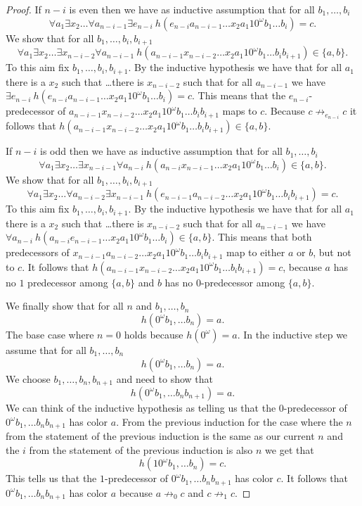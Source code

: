 \documentclass[a4paper]{article}
\begin{document}
\begin{proof}
If $n - i$ is even then we have as inductive assumption that for all
$b_1,\dots,b_i$
\[
 \forall a_1 \exists x_2 \dots \forall a_{n - i - 1} \exists e_{n - i} \
h(e_{n - i} a_{n - i - 1} \dots x_2 a_1 1 0^\omega b_1 \dots b_i) = c.
\]
We show that for all $b_1,\dots,b_i,b_{i + 1}$
\[
 \forall a_1 \exists x_2 \dots \exists x_{n - i - 2} \forall a_{n - i -
1} \ h(a_{n - i - 1} x_{n - i - 2} \dots x_2 a_1 1 0^\omega b_1 \dots
b_i b_{i + 1}) \in \{a,b\}.
\]
To this aim fix $b_1,\dots,b_i,b_{i + 1}$. By the inductive hypothesis
we have that for all $a_1$ there is a $x_2$ such that \dots there is
$x_{n - i - 2}$ such that for all $a_{n - i - 1}$ we have $\exists e_{n
- i} \ h(e_{n - i} a_{n - i - 1} \dots x_2 a_1 1 0^\omega b_1 \dots b_i)
  = c$. This means that the $e_{n - i}$-predecessor of $a_{n - i - 1}
x_{n - i - 2} \dots x_2 a_1 1 0^\omega b_1 \dots b_i b_{i + 1}$ maps to
$c$. Because $c \not \rightarrow_{e_{n - i}} c$ it follows that $h(a_{n
- i - 1} x_{n - i - 2} \dots x_2 a_1 1 0^\omega b_1 \dots b_i b_{i + 1})
\in \{a,b\}$.

If $n - i$ is odd then we have as inductive assumption that for all
$b_1,\dots,b_i$
\[
 \forall a_1 \exists x_2
\dots \exists x_{n - i - 1} \forall a_{n - i} \
h(a_{n - i} x_{n - i - 1} \dots
x_2 a_1 1 0^\omega b_1 \dots b_i) \in \{a,b\}.
\]
We show that for all $b_1,\dots,b_i,b_{i + 1}$
\[
 \forall a_1 \exists x_2 \dots \forall a_{n - i - 2} \exists x_{n - i -
1} \ h(e_{n - i - 1} a_{n - i - 2} \dots x_2 a_1 1 0^\omega b_1 \dots
b_i b_{i + 1}) = c.
\]
To this aim fix $b_1,\dots,b_i,b_{i + 1}$. By the inductive hypothesis
we have that for all $a_1$ there is a $x_2$ such that \dots there is
$x_{n - i - 2}$ such that for all $a_{n - i - 1}$ we have $\forall a_{n
- i} \ h(a_{n - i} e_{n - i - 1} \dots x_2 a_1 1 0^\omega b_1 \dots b_i)
  \in \{a,b\}$. This means that both predecessors of $x_{n - i - 1} a_{n
- i - 2} \dots x_2 a_1 1 0^\omega b_1 \dots b_i b_{i + 1}$ map to either
$a$ or $b$, but not to $c$. It follows that $h(a_{n - i - 1} x_{n - i -
2} \dots x_2 a_1 1 0^\omega b_1 \dots b_i b_{i + 1}) = c$, because $a$
has no $1$ predecessor among $\{a,b\}$ and $b$ has no $0$-predecessor
among $\{a, b\}$.

\medskip

We finally show that for all $n$ and $b_1,\dots,b_n$
\[
 h(0^\omega b_1,\dots b_n) = a.
\]
The base case where $n = 0$ holds because $h(0^\omega) = a$.
In the inductive step we assume that for all $b_1,\dots,b_n$
\[
 h(0^\omega b_1,\dots b_n) = a.
\]
We choose $b_1,\dots,b_n,b_{n + 1}$ and need to show that
\[
 h(0^\omega b_1,\dots b_n b_{n + 1}) = a.
\]
We can think of the inductive hypothesis as telling us that the
$0$-predecessor of $0^\omega b_1,\dots b_n b_{n + 1}$ has color $a$.
From the previous induction for the case where the $n$ from the
statement of the previous induction is the same as our current $n$ and
the $i$ from the statement of the previous induction is also $n$ we get
that
\[
 h(1 0^\omega b_1,\dots b_n) = c.
\]
This tells us that the $1$-predecessor of $0^\omega b_1,\dots b_n b_{n +
1}$ has color $c$. It follows that $0^\omega b_1,\dots b_n b_{n +
1}$ has color $a$ because $a \not \rightarrow_0 c$ and $c \not
\rightarrow_1 c$.


\end{proof}
\end{document}
